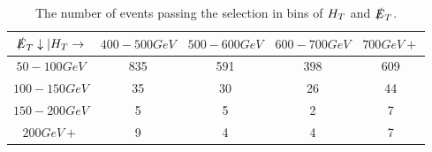 \begin{table}
\begin{center}
\begin{tabular}{|c|c|c|c|c|}
\hline
$\slashed{E}_{T}\downarrow | H_{T}\rightarrow$ & $400-500\unit{GeV}$ & $500-600\unit{GeV}$ 
& $600-700\unit{GeV}$ & $700\unit{GeV}+$ \\ 
\hline
$50-100\unit{GeV}$ & 835 & 591 & 398 & 609 \\
\hline
$100-150\unit{GeV}$ & 35 & 30 & 26 & 44 \\
\hline
$150-200\unit{GeV}$ & 5 & 5 & 2 & 7 \\
\hline
$200\unit{GeV}+$ & 9 & 4 & 4 & 7 \\
\hline
\end{tabular}
\end{center}
\caption{The number of events passing the selection in bins of $H_{T}$ and $\slashed{E}_{T}$.}
\label{tab:events}
\end{table}
